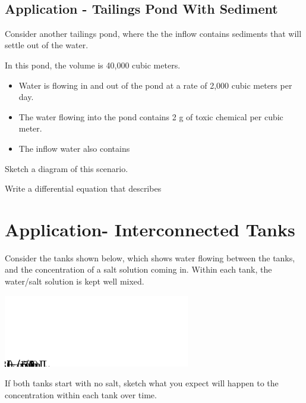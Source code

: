 \newpage
~ 
\newpage

\subsection*{Application - Tailings Pond With Sediment}
Consider another tailings pond, where the the inflow contains
sediments that will settle out of the water.

In this pond, the volume is 40,000 cubic meters.  
\begin{itemize}
\item Water is flowing in and out of the pond at a rate of 2,000 cubic
  meters per day.
\item The water flowing into the pond contains 2 g of toxic chemical
  per cubic meter.
\item The inflow water also contains 
\end{itemize}

\problem Sketch a diagram of this scenario.

\newpage

Write a differential equation that describes


\newpage
{}
\section*{Application- Interconnected Tanks}

\noindent
Consider the tanks shown below, which shows water flowing between the
tanks, and the concentration of a salt solution coming in.  Within
each tank, the water/salt solution is kept well mixed.
\begin{center}
\includegraphics[width=0.7\linewidth]{graphics/notes_09_tanks1}
\end{center}

\begin{problem}
  If both tanks start with no salt, sketch what you expect will happen
  to the concentration within each tank over time.
\end{problem}

